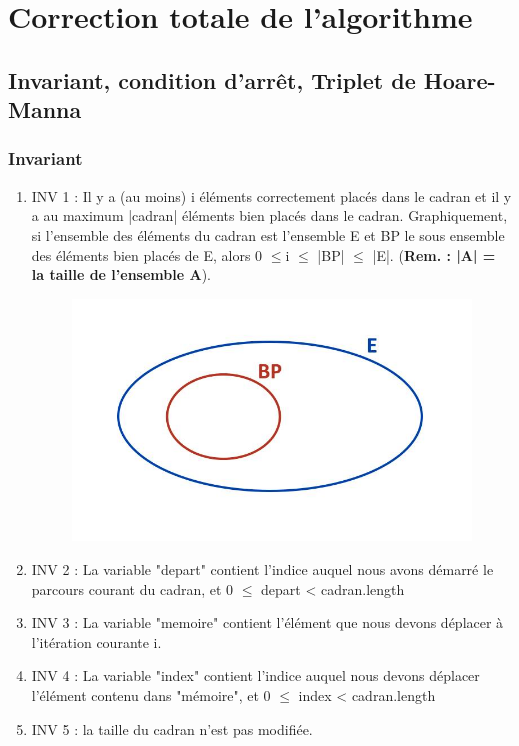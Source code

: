 \documentclass[a4paper, 12pt]{article}
\begin{document}
\section{Correction totale de l'algorithme}
\subsection{Invariant, condition d'arrêt, Triplet de Hoare-Manna}
\subsubsection*{Invariant}

\vspace{0.2cm}

\begin{enumerate}
\item INV 1 : Il y a (au moins) i éléments correctement placés dans le cadran et il y a au maximum |cadran| éléments bien placés dans le cadran.
Graphiquement, si l'ensemble des éléments du cadran est l'ensemble E et BP le sous ensemble des éléments bien placés de E, alors 0 $\le$i $\le$ |BP| $\le$ |E|. (\textbf{Rem. : |A| = la taille de l'ensemble A}).\\

\begin{figure}[h]
   \includegraphics[scale=0.5]{Ensembles}
\end{figure}


\item INV 2 : La variable "depart" contient l'indice auquel nous avons démarré le parcours courant du cadran, et 0 $\le$ depart < cadran.length

\item INV 3 : La variable "memoire" contient l'élément que nous devons déplacer à l'itération courante i.

\item INV 4 : La variable "index" contient l'indice auquel nous devons déplacer l'élément contenu dans "mémoire", et 0 $\le$ index < cadran.length

\item INV 5 : la taille du cadran n'est pas modifiée.
\end{enumerate}
\end{document}
